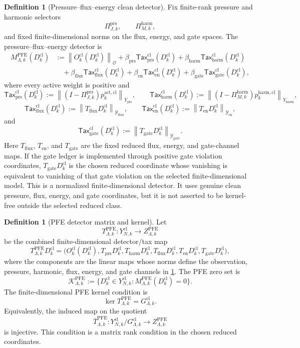 \documentclass[11pt]{article}
\numberwithin{equation}{section}
\theoremstyle{plain}
\theoremstyle{definition}
\newtheorem{definition}[theorem]{Definition}
\theoremstyle{remark}
\newcommand{\cl}{\mathrm{cl}}
\newcommand{\prs}{\mathrm{prs}}
\newcommand{\harm}{\mathrm{harm}}
\newcommand{\gate}{\mathrm{gate}}
\newcommand{\Tax}{\mathsf{Tax}}
\newcommand{\K}{\mathcal K}
\newcommand{\norm}[1]{\left\lVert #1\right\rVert}
\begin{document}
\begin{definition}[Pressure--flux--energy clean detector]\label{def:pfe-detector}
Fix finite-rank pressure and harmonic selectors
\[
  \Pi_{J,k}^{\prs},\qquad \Pi_{M,k}^{\harm},
\]
and fixed finite-dimensional norms on the flux, energy, and gate spaces.  The
pressure--flux--energy detector is
\begin{align*}
  M_{\Lambda,k}^{\mathrm{PFE}}(D_k^{\cl})
  &:=
  \norm{O_k^{\cl}(D_k^{\cl})}_{\mathcal O}
  +\beta_{\prs}\Tax_{\prs}^{\cl}(D_k^{\cl})
  +\beta_{\harm}\Tax_{\harm}^{\cl}(D_k^{\cl})\\
  &\quad
  +\beta_{\mathrm{flux}}\Tax_{\mathrm{flux}}^{\cl}(D_k^{\cl})
  +\beta_{\mathrm{en}}\Tax_{\mathrm{en}}^{\cl}(D_k^{\cl})
  +\beta_{\gate}\Tax_{\gate}^{\cl}(D_k^{\cl}),
\end{align*}
where every active weight is positive and
\[
  \Tax_{\prs}^{\cl}(D_k^{\cl})
  :=
  \norm{(I-\Pi_{J,k}^{\prs})p_k^{\mathrm{act},\cl}}_{Y_{\prs}},
  \qquad
  \Tax_{\harm}^{\cl}(D_k^{\cl})
  :=
  \norm{(I-\Pi_{M,k}^{\harm})p_k^{\harm,\cl}}_{Y_{\harm}},
\]
\[
  \Tax_{\mathrm{flux}}^{\cl}(D_k^{\cl})
  :=
  \norm{T_{\mathrm{flux}}D_k^{\cl}}_{\mathcal Y_{\mathrm{flux}}},
  \qquad
  \Tax_{\mathrm{en}}^{\cl}(D_k^{\cl})
  :=
  \norm{T_{\mathrm{en}}D_k^{\cl}}_{\mathcal Y_{\mathrm{en}}},
\]
and
\[
  \Tax_{\gate}^{\cl}(D_k^{\cl})
  :=
  \norm{T_{\gate}D_k^{\cl}}_{\mathcal Y_{\gate}}.
\]
Here \(T_{\mathrm{flux}}\), \(T_{\mathrm{en}}\), and \(T_{\gate}\) are the
fixed reduced flux, energy, and gate-channel maps.  If the gate ledger is
implemented through positive gate violation coordinates, \(T_{\gate}D_k^{\cl}\) is
the chosen reduced coordinate whose vanishing is equivalent to vanishing of
that gate violation on the selected finite-dimensional model.
This is a normalized finite-dimensional detector.  It uses genuine clean
pressure, flux, energy, and gate coordinates, but it is not asserted to be
kernel-free outside the selected reduced class.
\end{definition}

\begin{definition}[PFE detector matrix and kernel]\label{def:pfe-matrix}
Let
\[
  T_{\Lambda,k}^{\mathrm{PFE}}:Y_{N,k}^{\cl}\to
  Z_{\Lambda,k}^{\mathrm{PFE}}
\]
be the combined finite-dimensional detector/tax map
\[
  T_{\Lambda,k}^{\mathrm{PFE}}D_k^{\cl}
  =
  \bigl(
    O_k^{\cl}(D_k^{\cl}),
    T_{\prs}D_k^{\cl},
    T_{\harm}D_k^{\cl},
    T_{\mathrm{flux}}D_k^{\cl},
    T_{\mathrm{en}}D_k^{\cl},
    T_{\gate}D_k^{\cl}
  \bigr),
\]
where the components are the linear maps whose norms define the observation,
pressure, harmonic, flux, energy, and gate channels in
\cref{def:pfe-detector}.  The PFE zero set is
\[
  \K_{\Lambda,k}^{\mathrm{PFE}}
  :=
  \{D_k^{\cl}\in Y_{N,k}^{\cl}:M_{\Lambda,k}^{\mathrm{PFE}}(D_k^{\cl})=0\}.
\]
The finite-dimensional PFE kernel condition is
\[
  \ker T_{\Lambda,k}^{\mathrm{PFE}}=G_{\Lambda,k}^{\cl}.
\]
Equivalently, the induced map on the quotient
\[
  \overline T_{\Lambda,k}^{\mathrm{PFE}}:
  Y_{N,k}^{\cl}/G_{\Lambda,k}^{\cl}\to Z_{\Lambda,k}^{\mathrm{PFE}}
\]
is injective.  This condition is a matrix rank condition in the chosen
reduced coordinates.
\end{definition}
\end{document}

